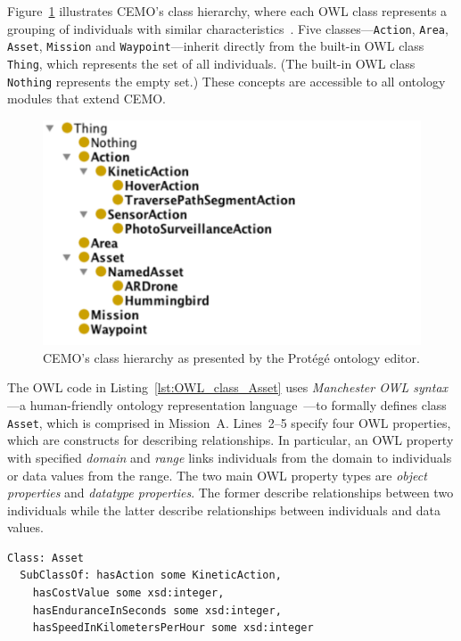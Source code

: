 Figure~\ref{fig:complex_missions_ontology} illustrates CEMO's class hierarchy, where each OWL class represents a grouping of individuals with similar characteristics~\cite{Bechhofer_2004}. Five classes---\texttt{Action}, \texttt{Area}, \texttt{Asset}, \texttt{Mission} and \texttt{Waypoint}---inherit directly from the built-in OWL class \texttt{Thing}, which represents the set of all individuals. (The built-in OWL class \texttt{Nothing} represents the empty set.) These concepts are accessible to all ontology modules that extend CEMO\@.

\begin{figure}[ht]
\centering
\includegraphics[scale=0.63]{img/cemo.pdf}
\caption[CEMO's class hierarchy]{CEMO's class hierarchy as presented by the Prot\'eg\'e ontology editor.}
\label{fig:complex_missions_ontology}
\end{figure}

The OWL code in Listing~\ref{lst:OWL_class_Asset} uses \emph{Manchester OWL syntax}---a human-friendly ontology representation language~\cite{Horridge_2006}---to formally defines class \texttt{Asset}, which is comprised in Mission~A\@. Lines~2--5 specify four OWL properties, which are constructs for describing relationships. In particular, an OWL property with specified \emph{domain} and \emph{range} links individuals from the domain to individuals or data values from the range. The two main OWL property types are \emph{object properties} and \emph{datatype properties}. The former describe relationships between two individuals while the latter describe relationships between individuals and data values.

\begin{lstlisting}[caption={OWL code for class \texttt{Asset}},label=lst:OWL_class_Asset]
Class: Asset
  SubClassOf: hasAction some KineticAction,
    hasCostValue some xsd:integer,
    hasEnduranceInSeconds some xsd:integer,
    hasSpeedInKilometersPerHour some xsd:integer
\end{lstlisting}

